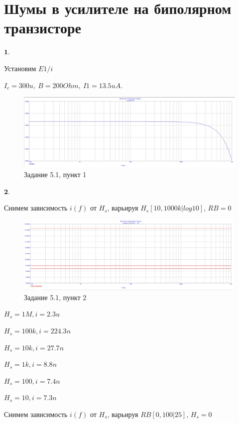 \documentclass[a4paper, 14pt]{extarticle}%
\begin{document}
\newpage

\section{Шумы в усилителе на биполярном транзисторе}

$\textbf{1.}$


Установим ${E1/i}$

$I_c = 300u, \:B = 200Ohm, \: I1 = 13.5uA.$

\begin{figure}[h!]
			\centering
			\includegraphics[width=1.1\linewidth]{5/5_1_1.jpg}
			\caption{Задание 5.1, пункт 1}
			\label{A}
\end{figure}

$\textbf{2.}$

Снимем зависимость $i(f)$ от $H_s$, варьируя $H_s[10, 1000k|log10]$, $RB = 0$

\begin{figure}[h!]
			\centering
			\includegraphics[width=1.1\linewidth]{5/5_1_2.jpg}
			\caption{Задание 5.1, пункт 2}
			\label{A}
\end{figure}

$H_s = 1M, i = 2.3u$

$H_s = 100k, i = 224.3n$

$H_s = 10k, i = 27.7n$

$H_s = 1k, i = 8.8n$

$H_s = 100, i = 7.4n$

$H_s = 10, i = 7.3n$

Снимем зависимость $i(f)$ от $H_s$, варьируя $RB[0, 100|25]$, $H_s = 0$
\end{document}
